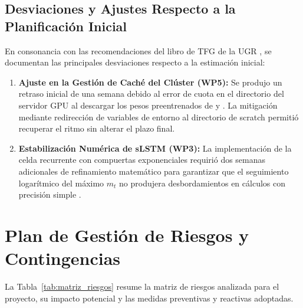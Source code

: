 \subsection{Desviaciones y Ajustes Respecto a la Planificación Inicial}
En consonancia con las recomendaciones del libro de TFG de la UGR \cite{guillen2025libro}, se documentan las principales desviaciones respecto a la estimación inicial:
\begin{enumerate}
    \item \textbf{Ajuste en la Gestión de Caché del Clúster (WP5):} Se produjo un retraso inicial de una semana debido al error de cuota en el directorio  del servidor GPU al descargar los pesos preentrenados de \chronos{} y \moment{}. La mitigación mediante redirección de variables de entorno al directorio de scratch permitió recuperar el ritmo sin alterar el plazo final.
    \item \textbf{Estabilización Numérica de sLSTM (WP3):} La implementación de la celda recurrente con compuertas exponenciales requirió dos semanas adicionales de refinamiento matemático para garantizar que el seguimiento logarítmico del máximo $m_t$ no produjera desbordamientos en cálculos con precisión simple .
\end{enumerate}


\section{Plan de Gestión de Riesgos y Contingencias}
\label{sec:plan_riesgos}

La Tabla~\ref{tab:matriz_riesgos} resume la matriz de riesgos analizada para el proyecto, su impacto potencial y las medidas preventivas y reactivas adoptadas.

